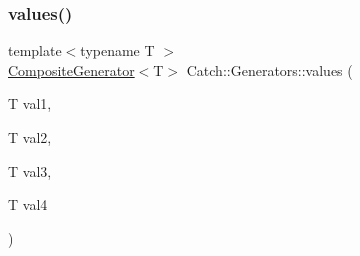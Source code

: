 \subsubsection{\texorpdfstring{values()}{values()}\hspace{0.1cm}{\footnotesize\ttfamily [3/3]}}
{\footnotesize\ttfamily template$<$typename T $>$ \\
\hyperlink{class_catch_1_1_composite_generator}{Composite\+Generator}$<$T$>$ Catch\+::\+Generators\+::values (\begin{DoxyParamCaption}\item[{T}]{val1,  }\item[{T}]{val2,  }\item[{T}]{val3,  }\item[{T}]{val4 }\end{DoxyParamCaption})}

